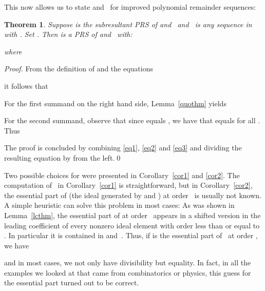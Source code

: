 \documentclass[3p,11pt,preprint]{elsarticle}
\newtheorem{theorem}{Theorem}
\begin{document}
This now allows us to state  and~ for improved polynomial remainder sequences:

\begin{theorem}
\label{newabs}
 Suppose  is the subresultant PRS of  and~ and~ is any sequence in  with . Set . Then  is a PRS of  and~ with: 

where

\end{theorem}

\begin{proof}
 From the definition of  and the equations

it follows that

For the first summand on the right hand side, Lemma~\ref{quothm} yields

For the second summand, observe that since  equals , we have that  equals  for all . Thus

The proof is concluded by combining \eqref{eq1}, \eqref{eq2} and \eqref{eq3} and dividing the resulting equation by  from the left.\qed
\end{proof}

Two possible choices for  were presented in Corollary~\ref{cor1} and \ref{cor2}. The computation of~ in Corollary~\ref{cor1} is straightforward, but in Corollary~\ref{cor2}, the essential part of  (the ideal generated by  and ) at order~ is usually not known. A simple heuristic can solve this problem in most cases: As was shown in Lemma~\ref{lcthm}, the essential part of  at order~ appears in a shifted version in the leading coefficient of every nonzero ideal element with order less than or equal to . In particular it is contained in  and~. Thus, if  is the essential part of~ at order , we have

and in most cases, we not only have divisibility but equality. In fact, in all the examples we looked at that came from combinatorics or physics, this guess for the essential part turned out to be correct.
\end{document}
